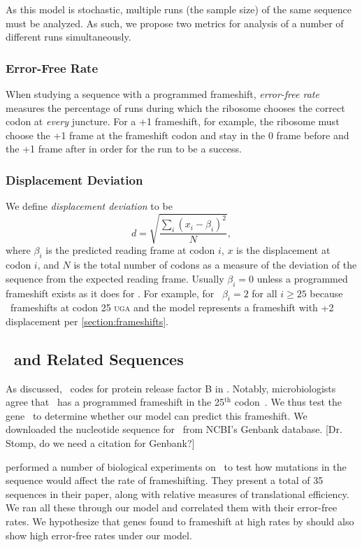 \documentclass[12pt, draft]{article}
\numberwithin{equation}{section}
\begin{document}
As this model is stochastic, multiple runs (the sample size) of the same sequence must be analyzed.
As such, we propose two metrics for analysis of a number of different runs 
simultaneously. 

\subsubsection{Error-Free Rate}
\label{section:efr}
When studying a
sequence with a programmed frameshift, \emph{error-free rate} measures the percentage of runs 
during which the ribosome chooses the correct codon
at \emph{every} juncture.  For a +1 frameshift, for example, the ribosome must
choose the +1 frame at the frameshift codon and stay in the 0 frame before
and the +1 frame after in order for the run to be a success.

\subsubsection{Displacement Deviation}
\label{section:deviation}

We define \emph{displacement deviation} to be
\begin{equation}
    d = \sqrt{\frac{\sum_i \left(x_i - \beta_i\right)^2}{N}},
\end{equation}
where $\beta_i$ is the predicted reading frame at codon $i$, $x$ is
the displacement at codon $i$, and $N$ is the total number of codons
as a measure of the deviation of the sequence from the expected
reading frame.  Usually $\beta_i = 0$ unless a programmed frameshift
exists as it does for \prfB.  For example, for \prfB\ $\beta_i = 2$
for all $i \geq 25$ because \prfB\ frameshifts at codon 25
\textsc{uga} and the model represents a frameshift with +2
displacement per \autoref{section:frameshifts}.

\subsection{\prfB\ and Related Sequences}
As discussed, \prfB\ codes for protein release factor B in \ecoli.
Notably, microbiologists agree that \prfB\ has a programmed frameshift
in the 25$^\textrm{th}$ codon~\cite{weiss87}.  We thus test the
gene \prfB\ to determine whether our model can predict this
frameshift.  We downloaded the nucleotide sequence for \prfB\ from
NCBI's Genbank database.  [Dr. Stomp, do we need a citation for Genbank?]

\citet{weiss87} performed a number of biological experiments on
\prfB\ to test how mutations in the sequence would affect the rate of
frameshifting.  They present a total of 35 sequences in their paper,
along with relative measures of translational efficiency.  We ran all
these through our model and correlated them with their error-free rates.
We hypothesize that genes found to frameshift at high rates by
\citeauthor{weiss87} should also show high error-free rates under
our model.
\end{document}
